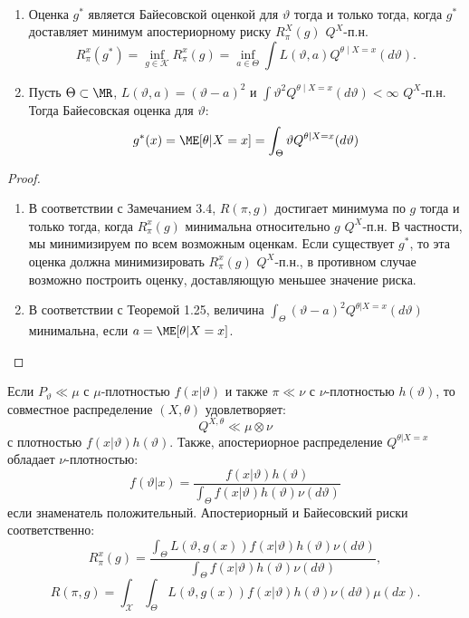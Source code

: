 \begin{thm} \label{thm3.5} \
	\begin{enumerate}
		\item Оценка $g^*$ является Байесовской оценкой для $\vartheta$ тогда и только тогда, когда $g^*$ доставляет минимум апостериорному риску $R_{\pi}^{X}(g)$ $Q^X$-п.н.
		\[R_{\pi}^x(g^*)=\inf_{g \in \mathcal{K}}R_{\pi}^x(g)=\inf_{a \in \Theta} \int L(\vartheta, a) Q^{\theta \mid X = x}(d\vartheta). \]
		\item Пусть $\Theta \subset \MR$, $L(\vartheta, a) = (\vartheta - a)^2$ и $\int \vartheta^2 Q^{\theta \mid X = x}(d\vartheta) < \infty$ $Q^X$-п.н. Тогда Байесовская оценка для $\vartheta$:
		\[g^*(x)=\ME[\theta | X = x] = \int_{\Theta} \vartheta Q^{\theta \mid X = x}(d\vartheta)\]
	\end{enumerate}
\end{thm}
\begin{proof}
	\begin{enumerate}
		\item В соответствии с Замечанием 3.4, $R(\pi, g)$ достигает минимума по $g$ тогда и только тогда, когда $R_{\pi}^x(g)$ минимальна относительно $g$ $Q^X$-п.н. В частности, мы минимизируем по всем возможным оценкам. Если существует $g^*$, то эта оценка должна минимизировать $R_{\pi}^x(g)$ $Q^X$-п.н., в противном случае возможно построить оценку, доставляющую меньшее значение риска.
		\item В соответствии с Теоремой 1.25, величина $\int_\Theta(\vartheta - a)^2 Q^{\theta|X=x}(d\vartheta)$ минимальна, если $a=\ME[\theta|X=x]$.
	\end{enumerate}
\end{proof}


\begin{rmrk}
	Если $P_\vartheta \ll \mu$ с $\mu$-плотностью $f(x|\vartheta)$ и также $\pi \ll \nu$ с $\nu$-плотностью $h(\vartheta)$, то совместное распределение $(X,\theta)$ удовлетворяет:
	\[ Q^{X, \theta} \ll \mu \otimes \nu  \]
	с плотностью $f(x|\vartheta) h(\vartheta)$. Также, апостериорное распределение $Q^{\theta | X=x}$ обладает $\nu$-плотностью:
	\[ f(\vartheta | x) = \frac{f(x|\vartheta) h(\vartheta)}{\int_\Theta f(x|\vartheta) h(\vartheta) \nu (d\vartheta)}
	\]
	если знаменатель положительный. Апостериорный и Байесовский риски соответственно:
	\[ R_\pi^x(g) = \frac{\int_\Theta L(\vartheta, g(x))f(x|\vartheta) h(\vartheta) \nu (d\vartheta)}{\int_\Theta f(x|\vartheta) h(\vartheta) \nu (d\vartheta)} , \]
	\[ R(\pi, g)=\int_{\mathcal{X}}\int_\Theta L(\vartheta, g(x))f(x|\vartheta) h(\vartheta) \nu (d\vartheta) \mu(dx). \]	
\end{rmrk}

